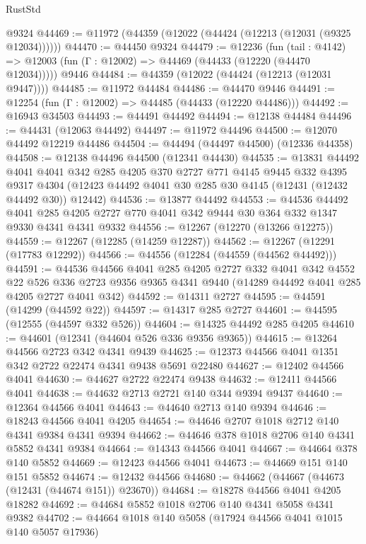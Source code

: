 \begin{lexlean}{RustStd}
\begin{coremodule}
    @9324
@44469 := @11972 (@44359 (@12022 (@44424 (@12213 (@12031 (@9325 @12034))))))
@44470 := @44450 @9324
@44479 := @12236
    (fun (tail : @4142) => @12003 (fun (Γ : @12002) => @44469 (@44433 (@12220 (@44470 @12034)))))
    @9446
@44484 := @44359 (@12022 (@44424 (@12213 (@12031 @9447))))
@44485 := @11972 @44484
@44486 := @44470 @9446
@44491 := @12254 (fun (Γ : @12002) => @44485 (@44433 (@12220 @44486)))
@44492 := @16943 @34503
@44493 := @44491 @44492
@44494 := @12138 @44484
@44496 := @44431 (@12063 @44492)
@44497 := @11972 @44496
@44500 := @12070 @44492 @12219 @44486
@44504 := @44494 (@44497 @44500) (@12336 @44358)
@44508 := @12138 @44496 @44500 (@12341 @44430)
@44535 := @13831
    @44492
    @4041
    @4041
    @342
    @285
    @4205
    @370
    @2727
    @771
    @4145
    @9445
    @332
    @4395
    @9317
    @4304
    (@12423 @44492 @4041 @30 @285 @30 @4145 (@12431 (@12432 @44492 @30)) @12442)
@44536 := @13877 @44492
@44553 := @44536
    @44492
    @4041
    @285
    @4205
    @2727
    @770
    @4041
    @342
    @9444
    @30
    @364
    @332
    @1347
    @9330
    @4341
    @4341
    @9332
@44556 := @12267 (@12270 (@13266 @12275))
@44559 := @12267 (@12285 (@14259 @12287))
@44562 := @12267 (@12291 (@17783 @12292))
@44566 := @44556 (@12284 (@44559 (@44562 @44492)))
@44591 := @44536
    @44566
    @4041
    @285
    @4205
    @2727
    @332
    @4041
    @342
    @4552
    @22
    @526
    @336
    @2723
    @9356
    @9365
    @4341
    @9440
    (@14289 @44492 @4041 @285 @4205 @2727 @4041 @342)
@44592 := @14311 @2727
@44595 := @44591 (@14299 (@44592 @22))
@44597 := @14317 @285 @2727
@44601 := @44595 (@12555 (@44597 @332 @526))
@44604 := @14325 @44492 @285 @4205
@44610 := @44601 (@12341 (@44604 @526 @336 @9356 @9365))
@44615 := @13264 @44566 @2723 @342 @4341 @9439
@44625 := @12373 @44566 @4041 @1351 @342 @2722 @22474 @4341 @9438 @5691 @22480
@44627 := @12402 @44566 @4041
@44630 := @44627 @2722 @22474 @9438
@44632 := @12411 @44566 @4041
@44638 := @44632 @2713 @2721 @140 @344 @9394 @9437
@44640 := @12364 @44566 @4041
@44643 := @44640 @2713 @140 @9394
@44646 := @18243 @44566 @4041 @4205
@44654 := @44646 @2707 @1018 @2712 @140 @4341 @9384 @4341 @9394
@44662 := @44646 @378 @1018 @2706 @140 @4341 @5852 @4341 @9384
@44664 := @14343 @44566 @4041
@44667 := @44664 @378 @140 @5852
@44669 := @12423 @44566 @4041
@44673 := @44669 @151 @140 @151 @5852
@44674 := @12432 @44566
@44680 := @44662 (@44667 (@44673 (@12431 (@44674 @151)) @23670))
@44684 := @18278 @44566 @4041 @4205 @18282
@44692 := @44684 @5852 @1018 @2706 @140 @4341 @5058 @4341 @9382
@44702 := @44664 @1018 @140 @5058 (@17924 @44566 @4041 @1015 @140 @5057 @17936)

\end{coremodule}
\end{lexlean}
